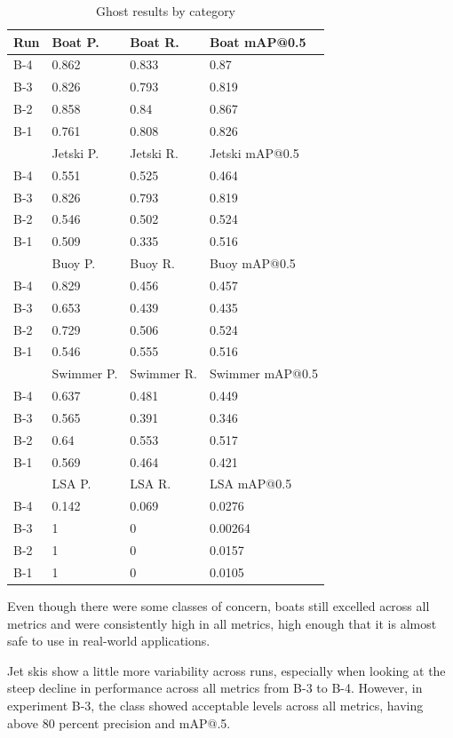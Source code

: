\documentclass[sigplan,nonacm]{acmart}
\begin{document}
\begin{table}[H]
\centering

\begin{tabular}{|l |l |l |l|} \hline     
Run & Boat P.& Boat R.& Boat mAP@0.5 \\ \hline 
B-4 & 0.862 & 0.833 & 0.87 \\ \hline 
B-3 & 0.826 & 0.793 & 0.819 \\ \hline 
B-2 & 0.858 & 0.84 & 0.867 \\ \hline 
B-1 & 0.761 & 0.808 & 0.826 \\ \hline 
 & Jetski P.& Jetski R.& Jetski mAP@0.5 \\ \hline 
B-4 & 0.551 & 0.525 & 0.464 \\ \hline 
B-3 & 0.826 & 0.793 & 0.819 \\ \hline 
B-2 & 0.546 & 0.502 & 0.524 \\ \hline 
B-1 & 0.509 & 0.335 & 0.516 \\ \hline 
 & Buoy P.& Buoy R.& Buoy mAP@0.5 \\ \hline 
B-4 & 0.829 & 0.456 & 0.457 \\ \hline 
B-3 & 0.653 & 0.439 & 0.435 \\ \hline 
B-2 & 0.729 & 0.506 & 0.524 \\ \hline 
B-1 & 0.546 & 0.555 & 0.516 \\ \hline 
 & Swimmer P.& Swimmer R.& Swimmer mAP@0.5 \\ \hline 
B-4 & 0.637 & 0.481 & 0.449 \\ \hline 
B-3 & 0.565 & 0.391 & 0.346 \\ \hline 
B-2 & 0.64 & 0.553 & 0.517 \\ \hline 
B-1 & 0.569 & 0.464 & 0.421 \\ \hline 
 & LSA P.& LSA R.& LSA mAP@0.5 \\ \hline 
B-4 & 0.142 & 0.069 & 0.0276 \\ \hline 
B-3 & 1 & 0 & 0.00264 \\ \hline 
B-2 & 1 & 0 & 0.0157 \\ \hline 
B-1 & 1 & 0 & 0.0105 \\ \hline
\end{tabular}
\caption{Ghost results by category}
\label{tab:ghostCat}
\end{table}
Even though there were some classes of concern, boats still excelled across all metrics and were consistently high in all metrics, high enough that it is almost safe to use in real-world applications. 

Jet skis show a little more variability across runs, especially when looking at the steep decline in performance across all metrics from B-3 to B-4. However, in experiment B-3, the class showed acceptable levels across all metrics, having above 80 percent precision and mAP@.5. 
\end{document}
